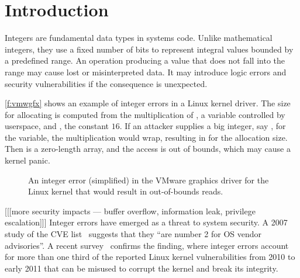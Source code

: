 \section{Introduction}
\label{s:intro}

Integers are fundamental data types in systems code.  Unlike
mathematical integers, they use a fixed number of bits to represent
integral values bounded by a predefined range.  An operation producing
a value that does not fall into the range may cause lost or
misinterpreted data.  It may introduce logic errors and security
vulnerabilities if the consequence is unexpected.

\autoref{f:vmwgfx} shows an example of integer errors in a Linux
kernel driver.  The size for allocating  is computed
from the multiplication of , a variable
controlled by userspace, and ,
the constant $16$.  If an attacker supplies a big integer, say
, for the variable, the multiplication would
wrap, resulting in  for the allocation
size.  Then  is a zero-length array, and the access
 is out of bounds, which may cause a kernel
panic.

\begin{figure}[h]

\caption{An integer error (simplified) in the VMware graphics driver
for the Linux kernel that would result in out-of-bounds reads.}
\label{f:vmwgfx}
\end{figure}

[[[more security impacts --- buffer overflow, information leak,
privilege escalation]]]
Integer errors have emerged as a threat to system security.  A 2007
study of the CVE list~\cite{christey:vuln} suggests that they ``are
number 2 for OS vendor advisories''.  A recent survey~\cite{chen:kbugs}
confirms the finding, where integer errors account for more than
one third of the reported Linux kernel vulnerabilities from 2010
to early 2011 that can be misused to corrupt the kernel and break
its integrity.

